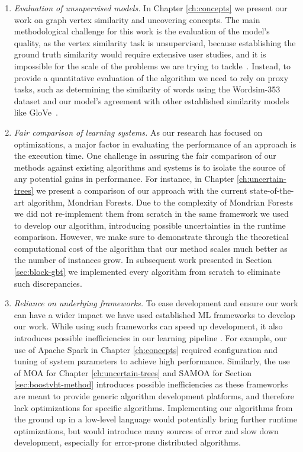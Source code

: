 \begin{enumerate}
	\item \emph{Evaluation of unsupervised models.} In Chapter \ref{ch:concepts} we present our
	work on graph vertex similarity and uncovering concepts. The main methodological
	challenge for this work is the evaluation of the model's quality, as the vertex
	similarity task is unsupervised, because establishing the ground truth similarity would
	require extensive user studies, and it is impossible for the scale of the problems
	we are trying to tackle~\cite{simrank}. Instead, to provide a quantitative evaluation
	of the algorithm we need to rely on proxy tasks, such as determining the similarity
	of words using the Wordsim-353 dataset \cite{wordsim} and our model's agreement
	with other established similarity models like GloVe~\cite{glove}.

	\item \emph{Fair comparison of learning systems.} As our research has focused on optimizations,
	a major factor in evaluating the performance of an approach is the execution time. One challenge
	in assuring the fair comparison of our methods against existing algorithms and systems is to isolate
	the source of any potential gains in performance. For instance, in Chapter
	\ref{ch:uncertain-trees} we present a comparison of our approach with the current
	state-of-the-art algorithm, Mondrian Forests. Due to the complexity of Mondrian Forests
	we did not re-implement them from scratch in the same framework we used to develop our
	algorithm, introducing possible uncertainties in the runtime comparison.
	However, we make sure to demonstrate through the theoretical computational cost of the
	algorithm that our method scales much better as the number of instances grow.
	In subsequent work presented in Section \ref{sec:block-gbt} we implemented every
	algorithm from scratch to eliminate such discrepancies.

	\item \emph{Reliance on underlying frameworks.} To ease development and ensure
	our work can have a wider impact we have used established ML frameworks to develop
	our work. While using such frameworks can speed up development, it also introduces possible inefficiencies
	in our learning pipeline \cite{scalability-cost}. For example, our use of Apache Spark \cite{spark}
	in Chapter \ref{ch:concepts} required configuration and tuning of system
	parameters to achieve high performance. Similarly, the use of MOA for
	Chapter \ref{ch:uncertain-trees} and SAMOA for Section \ref{sec:boostvht-method}
	introduces possible inefficiencies as these frameworks are meant to provide
	generic algorithm development platforms, and therefore lack optimizations for specific algorithms. Implementing our algorithms from the
	ground up in a low-level language would potentially bring further runtime
	optimizations, but would introduce many sources of error and slow down development, especially
	for error-prone distributed algorithms.
\end{enumerate}

